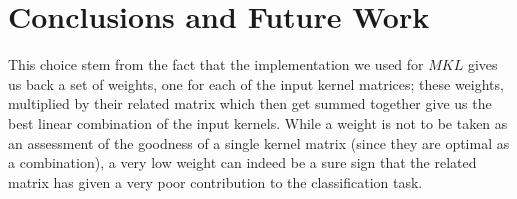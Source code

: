 
\chapter{Conclusions and Future Work}
\label{Chapter5}
This choice stem from the fact that the implementation we used for $MKL$ gives us
back a set of weights, one for each of the input kernel matrices; these weights,
multiplied by their related matrix which then get summed together give us the
best linear combination of the input kernels.
While a weight is not to be taken as an assessment of the goodness of a single
kernel matrix (since they are optimal as a combination), a very low weight can
indeed be a sure sign that the related matrix has given a very poor contribution
to the classification task.

